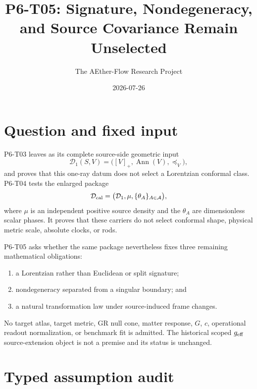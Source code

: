 \documentclass[11pt]{article}
\title{P6-T05: Signature, Nondegeneracy, and Source Covariance Remain Unselected}
\author{The AEther-Flow Research Project}
\date{2026-07-26}
\newcommand{\Ann}{\operatorname{Ann}}
\begin{document}
\maketitle

\begin{center}
\end{center}

\section{Question and fixed input}

P6-T03 leaves as its complete source-side geometric input
\[
  \mathcal D_1(S,V)=\bigl([V]_+,\Ann(V),\preceq_V\bigr),
\]
and proves that this one-ray datum does not select a Lorentzian conformal
class. P6-T04 tests the enlarged package
\[
  \mathcal D_{\rm cal}
  =\bigl(\mathcal D_1,\mu,\{\theta_A\}_{A\in\mathcal A}\bigr),
\]
where \(\mu\) is an independent positive source density and the
\(\theta_A\) are dimensionless scalar phases. It proves that these carriers
do not select conformal shape, physical metric scale, absolute clocks, or
rods.

P6-T05 asks whether the same package nevertheless fixes three remaining
mathematical obligations:
\begin{enumerate}
\item a Lorentzian rather than Euclidean or split signature;
\item nondegeneracy separated from a singular boundary; and
\item a natural transformation law under source-induced frame changes.
\end{enumerate}
No target atlas, target metric, GR null cone, matter response, \(G\), \(c\),
operational readout normalization, or benchmark fit is admitted. The historical scoped
\(g_{\rm eff}\) source-extension object is not a premise and its status is
unchanged.

\section{Typed assumption audit}
\end{document}
